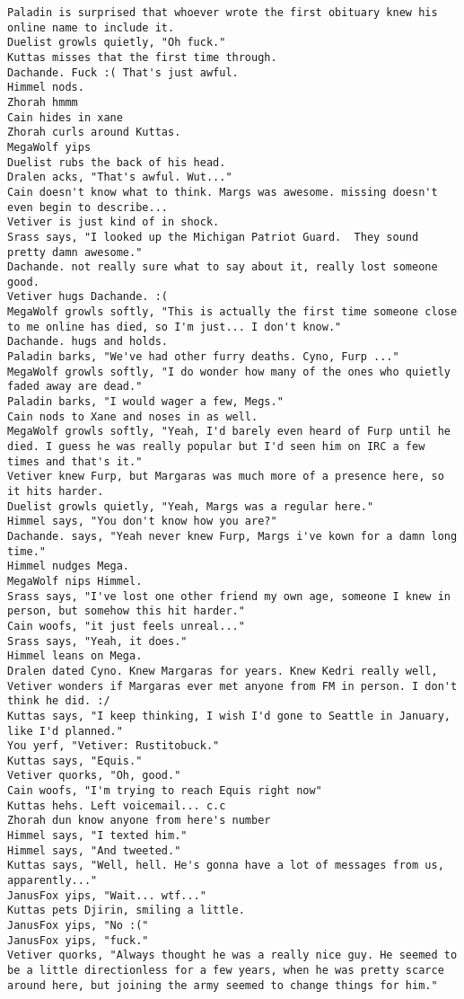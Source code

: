 \begin{verbatim}
Paladin is surprised that whoever wrote the first obituary knew his online name to include it.
Duelist growls quietly, "Oh fuck."
Kuttas misses that the first time through.
Dachande. Fuck :( That's just awful.
Himmel nods.
Zhorah hmmm
Cain hides in xane
Zhorah curls around Kuttas.
MegaWolf yips
Duelist rubs the back of his head.
Dralen acks, "That's awful. Wut..."
Cain doesn't know what to think. Margs was awesome. missing doesn't even begin to describe...
Vetiver is just kind of in shock.
Srass says, "I looked up the Michigan Patriot Guard.  They sound pretty damn awesome."
Dachande. not really sure what to say about it, really lost someone good.
Vetiver hugs Dachande. :(
MegaWolf growls softly, "This is actually the first time someone close to me online has died, so I'm just... I don't know."
Dachande. hugs and holds.
Paladin barks, "We've had other furry deaths. Cyno, Furp ..."
MegaWolf growls softly, "I do wonder how many of the ones who quietly faded away are dead."
Paladin barks, "I would wager a few, Megs."
Cain nods to Xane and noses in as well.
MegaWolf growls softly, "Yeah, I'd barely even heard of Furp until he died. I guess he was really popular but I'd seen him on IRC a few times and that's it."
Vetiver knew Furp, but Margaras was much more of a presence here, so it hits harder.
Duelist growls quietly, "Yeah, Margs was a regular here."
Himmel says, "You don't know how you are?"
Dachande. says, "Yeah never knew Furp, Margs i've kown for a damn long time."
Himmel nudges Mega.
MegaWolf nips Himmel.
Srass says, "I've lost one other friend my own age, someone I knew in person, but somehow this hit harder."
Cain woofs, "it just feels unreal..."
Srass says, "Yeah, it does."
Himmel leans on Mega.
Dralen dated Cyno. Knew Margaras for years. Knew Kedri really well,
Vetiver wonders if Margaras ever met anyone from FM in person. I don't think he did. :/
Kuttas says, "I keep thinking, I wish I'd gone to Seattle in January, like I'd planned."
You yerf, "Vetiver: Rustitobuck."
Kuttas says, "Equis."
Vetiver quorks, "Oh, good."
Cain woofs, "I'm trying to reach Equis right now"
Kuttas hehs. Left voicemail... c.c
Zhorah dun know anyone from here's number
Himmel says, "I texted him."
Himmel says, "And tweeted."
Kuttas says, "Well, hell. He's gonna have a lot of messages from us, apparently..."
JanusFox yips, "Wait... wtf..."
Kuttas pets Djirin, smiling a little.
JanusFox yips, "No :("
JanusFox yips, "fuck."
Vetiver quorks, "Always thought he was a really nice guy. He seemed to be a little directionless for a few years, when he was pretty scarce around here, but joining the army seemed to change things for him."

\end{verbatim}
